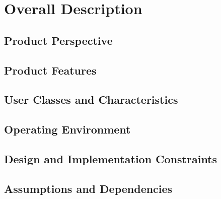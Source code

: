 \section{Overall Description}
%

\subsection{Product Perspective}

\subsection{Product Features}

\subsection{User Classes and Characteristics}

\subsection{Operating Environment}

\subsection{Design and Implementation Constraints}

\subsection{Assumptions and Dependencies}
%
